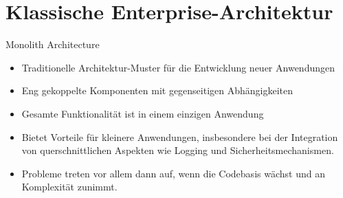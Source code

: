 \section{Klassische Enterprise-Architektur}


\begin{frame}{Monolith Architecture}
    \begin{itemize}
        \item Traditionelle Architektur-Muster für die Entwicklung neuer Anwendungen
        \item Eng gekoppelte Komponenten mit gegenseitigen Abhängigkeiten
        \item Gesamte Funktionalität ist in einem einzigen Anwendung
        \item Bietet Vorteile für kleinere Anwendungen, insbesondere bei der Integration von 
          querschnittlichen Aspekten wie Logging und Sicherheitsmechanismen.
        \item Probleme treten vor allem dann auf, wenn die Codebasis wächst und an Komplexität zunimmt.
      \end{itemize}
\end{frame}


